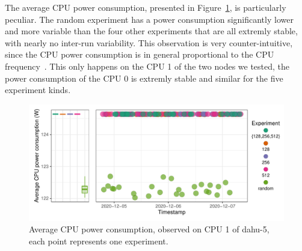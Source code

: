             The average CPU power consumption, presented in
            Figure~\ref{fig:randomizing_sizes:expfile:fixing_K:power_CPU}, is particularly peculiar. The random
            experiment has a power consumption significantly lower and more variable than the four other experiments
            that are all extremly stable, with nearly no inter-run variability. This observation is very
            counter-intuitive, since the CPU power consumption is in general proportional to the CPU
            frequency~\cite{heinrich:hal-01523608}.  This only happens on the CPU 1 of the two nodes we tested, the
            power consumption of the CPU 0 is extremly stable and similar for the five experiment kinds.

            \begin{figure}[htpb]
                \centering
                \includegraphics[width=1\linewidth]{img/experiment/randomizing_sizes/fixing_K/average_power_CPU.pdf}
                \caption{Average CPU power consumption, observed on CPU 1 of dahu-5, each point represents one experiment.}%
                \label{fig:randomizing_sizes:expfile:fixing_K:power_CPU}
            \end{figure}


